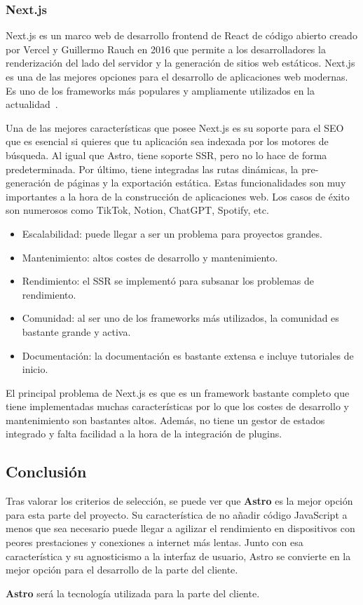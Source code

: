 \subsubsection{Next.js}

Next.js es un marco web de desarrollo frontend de React de código abierto creado por Vercel y Guillermo Rauch en 2016 que permite a los desarrolladores la renderización del lado del servidor y la generación de sitios web estáticos. Next.js es una de las mejores opciones para el desarrollo de aplicaciones web modernas. Es uno de los frameworks más populares y ampliamente utilizados en la actualidad~\cite{nextjs-wikipedia}.

Una de las mejores características que posee Next.js es su soporte para el SEO que es esencial si quieres que tu aplicación sea indexada por los motores de búsqueda. Al igual que Astro, tiene soporte SSR, pero no lo hace de forma predeterminada. Por último, tiene integradas las rutas dinámicas, la pre-generación de páginas y la exportación estática. Estas funcionalidades son muy importantes a la hora de la construcción de aplicaciones web. Los casos de éxito son numerosos como TikTok, Notion, ChatGPT, Spotify, etc.

\begin{itemize}
    \item[\bien] Escalabilidad: puede llegar a ser un problema para proyectos grandes.
    \item[\mal] Mantenimiento: altos costes de desarrollo y mantenimiento.
    \item[\regular] Rendimiento: el SSR se implementó para subsanar los problemas de rendimiento.
    \item[\esp] Comunidad: al ser uno de los frameworks más utilizados, la comunidad es bastante grande y activa.
    \item[\bien] Documentación: la documentación es bastante extensa e incluye tutoriales de inicio.
\end{itemize}

El principal problema de Next.js es que es un framework bastante completo que tiene implementadas muchas características por lo que los costes de desarrollo y mantenimiento son bastantes altos. Además, no tiene un gestor de estados integrado y falta facilidad a la hora de la integración de plugins.

\subsection{Conclusión}

Tras valorar los criterios de selección, se puede ver que \textbf{Astro} es la mejor opción para esta parte del proyecto. Su característica de no añadir código JavaScript a menos que sea necesario puede llegar a agilizar el rendimiento en dispositivos con peores prestaciones y conexiones a internet más lentas. Junto con esa característica y su agnosticismo a la interfaz de usuario, Astro se convierte en la mejor opción para el desarrollo de la parte del cliente.

\textbf{Astro} será la tecnología utilizada para la parte del cliente.